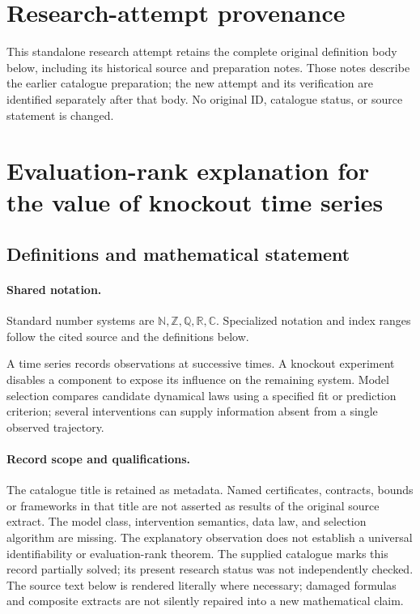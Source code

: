 \documentclass[11pt]{article}
\begin{document}
\section*{Research-attempt provenance}
This standalone research attempt retains the complete original definition body below,
including its historical source and preparation notes. Those notes describe the
earlier catalogue preparation; the new attempt and its verification are identified
separately after that body. No original ID, catalogue status, or source statement is changed.

\section{Evaluation-rank explanation for the value of knockout time series}\label{statement}

\subsection{Definitions and mathematical statement}

\paragraph{Shared notation.}Standard number systems are $\mathbb N,\mathbb Z,\mathbb Q,\mathbb R,\mathbb C$. Specialized notation and index ranges follow the cited source and the definitions below.


A time series records observations at successive times. A knockout experiment disables a component to expose its influence on the remaining system. Model selection compares candidate dynamical laws using a specified fit or prediction criterion; several interventions can supply information absent from a single observed trajectory.
\paragraph{Record scope and qualifications.}
The catalogue title is retained as metadata. Named certificates, contracts, bounds or frameworks in that title are not asserted as results of the original source extract.
The model class, intervention semantics, data law, and selection algorithm are missing. The explanatory observation does not establish a universal identifiability or evaluation-rank theorem. The supplied catalogue marks this record partially solved; its present research status was not independently checked.
The source text below is rendered literally where necessary; damaged formulas and composite extracts are not silently repaired into a new mathematical claim.
\end{document}
